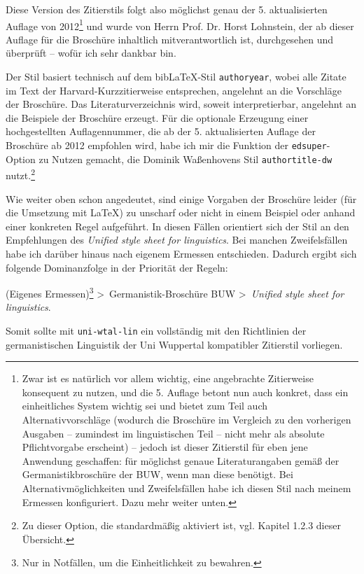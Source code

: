 \documentclass[12pt,notitlepage,parskip]{scrartcl}
\begin{document}
Diese Version des Zitierstils folgt also möglichst genau der 5. aktualisierten
Auflage von 2012\footnote{Zwar ist es natürlich vor allem wichtig, eine
angebrachte Zitierweise konsequent zu nutzen, und die 5. Auflage betont nun auch
konkret, dass ein einheitliches System wichtig sei und bietet zum Teil auch
Alternativvorschläge (wodurch die Broschüre im Vergleich zu den vorherigen
Ausgaben – zumindest im linguistischen Teil – nicht mehr als absolute
Pflichtvorgabe erscheint) – jedoch ist dieser Zitierstil für eben jene Anwendung
geschaffen: für möglichst genaue Literaturangaben gemäß der Germanistikbroschüre
der BUW, wenn man diese benötigt. Bei Alternativmöglichkeiten und Zweifelsfällen
habe ich diesen Stil nach meinem Ermessen konfiguriert. Dazu mehr weiter unten.}
und wurde von Herrn Prof. Dr.
Horst Lohnstein, der ab dieser Auflage für die Broschüre inhaltlich
mitverantwortlich ist, durchgesehen und überprüft – wofür ich sehr dankbar bin.

Der Stil basiert technisch auf dem bib\LaTeX-Stil \texttt{authoryear}, wobei
alle Zitate im Text der Harvard-Kurzzitierweise entsprechen, angelehnt an die
Vorschläge der Broschüre.
Das Literaturverzeichnis wird, soweit interpretierbar, angelehnt an die
Beispiele der Broschüre erzeugt. Für die optionale Erzeugung einer
hochgestellten Auflagennummer, die ab der 5. aktualisierten Auflage der
Broschüre ab 2012 empfohlen wird, habe ich mir die Funktion der
\texttt{edsuper}-Option zu Nutzen gemacht, die Dominik Waßenhovens Stil
\texttt{authortitle-dw} nutzt.\footnote{Zu dieser Option, die standardmäßig
aktiviert ist, vgl. Kapitel 1.2.3 dieser Übersicht.}

Wie weiter oben schon angedeutet, sind einige Vorgaben der Broschüre leider (für
die Umsetzung mit \LaTeX) zu unscharf oder nicht in einem Beispiel oder anhand einer
konkreten Regel aufgeführt.
In diesen Fällen orientiert sich der Stil an den Empfehlungen des
\textit{Unified style sheet for linguistics}. Bei manchen Zweifelsfällen habe
ich darüber hinaus nach eigenem Ermessen entschieden.
Dadurch ergibt sich folgende Dominanzfolge in der Priorität der Regeln:

(Eigenes Ermessen)\footnote{Nur in Notfällen, um die Einheitlichkeit zu
bewahren.} \textgreater\ Germanistik-Broschüre BUW \textgreater\ 
\textit{Unified style sheet for linguistics}.

Somit sollte mit \texttt{uni-wtal-lin} ein vollständig mit den Richtlinien der
germanistischen Linguistik der Uni Wuppertal kompatibler Zitierstil vorliegen.
\end{document}
